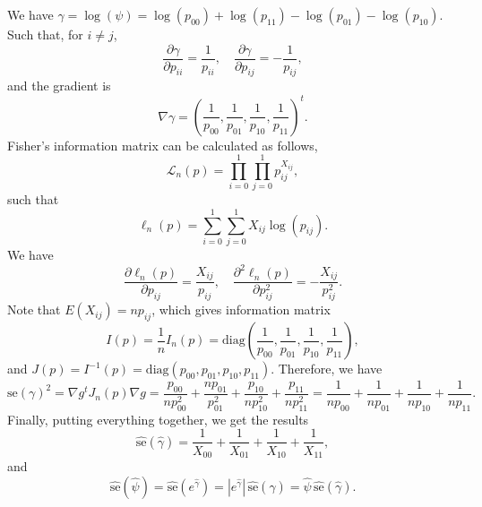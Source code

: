 We have $\gamma = \log(\psi) = \log(p_{00}) + \log(p_{11}) - \log(p_{01}) - \log(p_{10})$.
Such that, for $i \neq j$,
\begin{equation*}
    \frac{\partial \gamma}{\partial p_{ii}} = \frac{1}{p_{ii}}, \quad
    \frac{\partial \gamma}{\partial p_{ij}} = -\frac{1}{p_{ij}},
\end{equation*}
and the gradient is
\begin{equation*}
    \nabla \gamma = \left(\frac{1}{p_{00}}, \frac{1}{p_{01}}, \frac{1}{p_{10}}, \frac{1}{p_{11}}\right)^t.
\end{equation*}
Fisher's information matrix can be calculated as follows,
\begin{equation*}
    \mathcal{L}_n(p) = \prod_{i = 0}^1 \prod_{j = 0}^1 p_{ij}^{X_{ij}},
\end{equation*}
such that
\begin{equation*}
    \ell_n(p) = \sum_{i = 0}^1 \sum_{j = 0}^1 X_{ij} \log(p_{ij}).
\end{equation*}
We have
\begin{equation*}
    \frac{\partial \ell_n(p)}{\partial p_{ij}} = \frac{X_{ij}}{p_{ij}}, \quad
    \frac{\partial^2 \ell_n(p)}{\partial p_{ij}^2} = -\frac{X_{ij}}{p_{ij}^2}.
\end{equation*}
Note that $E(X_{ij}) = np_{ij}$, which gives information matrix
\begin{equation*}
    I(p) = \frac{1}{n} I_n(p) = \textrm{diag}\left(\frac{1}{p_{00}}, \frac{1}{p_{01}}, \frac{1}{p_{10}}, \frac{1}{p_{11}}\right),
\end{equation*}
and $J(p) = I^{-1}(p) = \textrm{diag}(p_{00}, p_{01}, p_{10}, p_{11})$.
Therefore, we have
\begin{equation*}
    \mathrm{se}(\gamma)^2 = \nabla g^t J_n(p) \nabla g
        = \frac{p_{00}}{np_{00}^2} + \frac{np_{01}}{p_{01}^2} + \frac{p_{10}}{np_{10}^2} + \frac{p_{11}}{np_{11}^2}
        = \frac{1}{np_{00}} + \frac{1}{np_{01}} + \frac{1}{np_{10}} + \frac{1}{np_{11}}.
\end{equation*}
Finally, putting everything together, we get the results
\begin{equation*}
    \hat{\mathrm{se}}(\hat{\gamma}) = \frac{1}{X_{00}} + \frac{1}{X_{01}} + \frac{1}{X_{10}} + \frac{1}{X_{11}},
\end{equation*}
and
\begin{equation*}
    \hat{\mathrm{se}}(\hat{\psi}) = \hat{\mathrm{se}}(e^{\hat{\gamma}})
        = |e^{\hat{\gamma}}|\,\hat{\mathrm{se}}(\hat{\gamma})
        = \hat{\psi}\,\hat{\mathrm{se}}(\hat{\gamma}).
\end{equation*}
